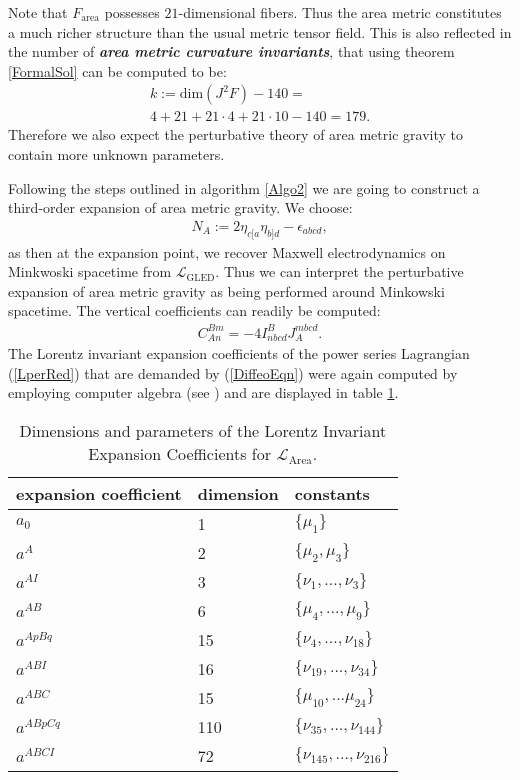 \documentclass[%
 reprint,
nofootinbib,
 amsmath,amssymb,
 aps,
 prd,
floatfix,
]{revtex4-2}
\begin{document}
Note that $F_{\text{area}}$ possesses $21$-dimensional fibers. Thus the area metric constitutes a much richer structure than the usual metric tensor field. This is also reflected in the number of \textit{\textbf{area metric curvature invariants}}, that using theorem \ref{FormalSol} can be computed to be:
\begin{multline}
    k:= \mathrm{dim}(J^2F) - 140 =\\
    4 + 21 + 21\cdot 4 + 21\cdot10 -140 = 179.
\end{multline}
Therefore we also expect the perturbative theory of area metric gravity to contain more unknown parameters.

Following the steps outlined in algorithm \ref{Algo2}
we are going to construct a third-order expansion of area metric gravity.
We choose:
\begin{align}
N_A := 2 \eta_{c[a} \eta_{b]d} - \epsilon_{abcd},
\end{align}
as then at the expansion point, we recover Maxwell electrodynamics on Minkwoski spacetime from $\mathcal{L}_{\text{GLED}}$.
Thus we can interpret the perturbative expansion of area metric gravity as being performed around Minkowski spacetime.
The vertical coefficients can readily be computed:
\begin{align}\label{areaGotayMInter}
    C_{An}^{Bm} = -4 I^B_{nbcd} J_A^{mbcd}.
\end{align}
The Lorentz invariant expansion coefficients of the power series Lagrangian (\ref{LperRed}) that are demanded by (\ref{DiffeoEqn}) were again computed by employing computer algebra (see \cite{sparse-tensor}) and are displayed in table \ref{AreaExp}.
\begin{table}
\centering 
\begin{tabular}{lll} \toprule
    expansion coefficient & dimension & constants   \\ \midrule
    $a_0$ & 1 & $\{\mu_1\}$ \\
    $a^A$ & 2 & $\{\mu_2,\mu_3\}$ \\
    $a^{AI}$ & 3 & $\{\nu_1,..., \nu_3\}$ \\
    $a^{AB}$ & 6 & $\{\mu_4,..., \mu_9 \} $ \\
    $a^{ApBq}$ & 15 & $\{\nu_4,...,\nu_{18}\}$ \\
    $a^{ABI}$ & 16 & $\{ \nu_{19},...,\nu_{34} \}$ \\
    $a^{ABC}$ & 15 & $\{ \mu_{10},...\mu_{24} \}$\\
    $a^{ABpCq}$ & 110 & $\{\nu_{35},...,\nu_{144} \}$ \\
    $a^{ABCI}$ & 72 & $\{ \nu_{145},...,\nu_{216}\}$ \\ \bottomrule
\end{tabular}
\caption{Dimensions and parameters of the Lorentz Invariant Expansion Coefficients for $\mathcal{L}_{\text{Area}}$.}\label{AreaExp}
\end{table}
\end{document}
